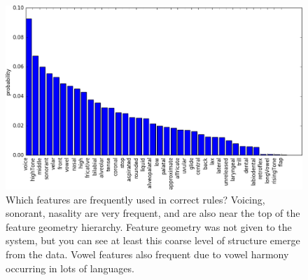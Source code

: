 \documentclass{article}
\begin{document}
\begin{figure}[h]
  \includegraphics[width = \textwidth]{featureFrequencies.png}
  \caption{Which features are frequently used in correct rules? Voicing, sonorant, nasality are very frequent, and are also near the top of the feature geometry hierarchy. Feature geometry was not given to the system, but you can see at least this coarse level of structure emerge from the data. Vowel features also frequent due to vowel harmony occurring in lots of languages.}
\end{figure}
\end{document}
